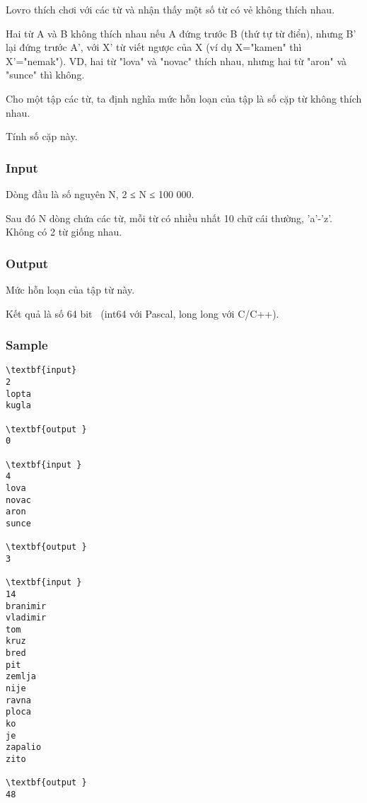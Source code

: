 

Lovro thích chơi với các từ và nhận thấy một số từ có vẻ không thích nhau.




Hai từ A và B không thích nhau nếu A đứng trước B (thứ tự từ điển), nhưng B' lại đứng trước A', với X' từ viết ngược của X (ví dụ X="kamen" thì X'="nemak"). VD, hai từ "lova" và "novac" thích nhau, nhưng hai từ "aron" và "sunce" thì không.

Cho một tập các từ, ta định nghĩa mức hỗn loạn của tập là số cặp từ không thích nhau.

Tính số cặp này.

\subsubsection{Input}

Dòng đầu là số nguyên N, 2 ≤ N ≤ 100 000.

Sau đó N dòng chứa các từ, mỗi từ có nhiều nhất 10 chữ cái thường, 'a'-'z'. Không có 2 từ giống nhau.

\subsubsection{Output}

Mức hỗn loạn của tập từ này.

Kết quả là số 64 bit  (int64 với Pascal, long long với C/C++).

\subsubsection{Sample}
\begin{verbatim}
\textbf{input}  
2 
lopta 
kugla 
 
\textbf{output }
0

\textbf{input } 
4 
lova 
novac 
aron 
sunce 
 
\textbf{output }
3

\textbf{input } 
14 
branimir 
vladimir 
tom 
kruz 
bred 
pit 
zemlja 
nije 
ravna 
ploca 
ko 
je 
zapalio 
zito 
 
\textbf{output } 
48
\end{verbatim}

